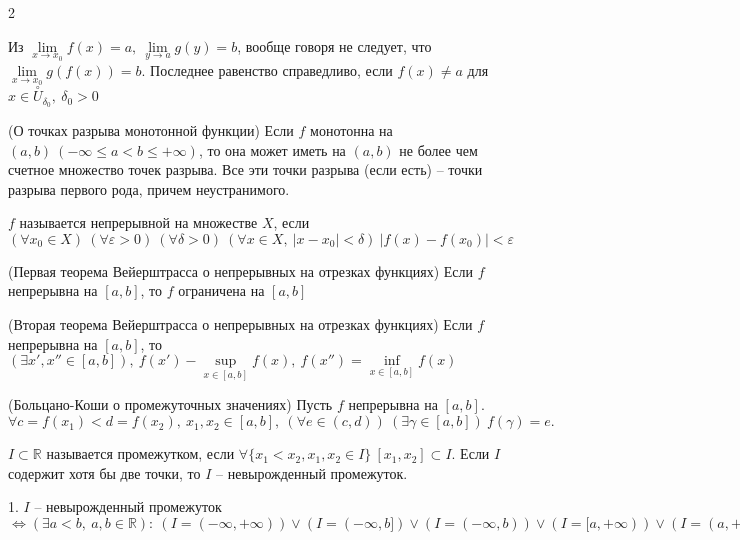 \begin{multicols}{2}
\begin{note}{}{} 
    Из $\lim\limits_{x\to x_0} f(x) = a,\ \lim\limits_{y\to a} g(y) = b$, вообще говоря не следует, что $\lim\limits_{x\to x_0} g(f(x)) = b$. Последнее равенство справедливо, если $f(x) \neq a$ для $x \in \overset{\circ}{U}_{\delta_0},\ \delta_0 > 0$
\end{note}
\begin{theorema}{(О точках разрыва монотонной функции)}{} 
    Если $f$ монотонна на $(a,b)\ (-\infty \leq a < b \leq +\infty)$, то она может иметь на $(a,b)$ не более чем счетное множество точек разрыва. Все эти точки разрыва (если есть) -- точки разрыва первого рода, причем неустранимого.
\end{theorema}
\begin{definition}{}{}$f$ называется непрерывной на множестве $X$, если $(\forall x_0\in X)\ (\forall \varepsilon > 0)\ (\forall \delta > 0)\ (\forall x \in X,\ |x - x_0| < \delta)\ |f(x) - f(x_0)| < \varepsilon$
\end{definition}
\begin{theorema}{(Первая теорема Вейерштрасса о непрерывных на отрезках функциях)}{}
     Если $f$ непрерывна на $[a,b]$, то $f$ ограничена на $[a,b]$
\end{theorema}
\begin{theorema}{(Вторая теорема Вейерштрасса о непрерывных на отрезках функциях)}{} 
    Если $f$ непрерывна на $[a,b]$, то $(\exists x', x''\in [a,b]), \ f(x') - \sup\limits_{x\in [a,b]}f(x),\ f(x'') = \inf\limits_{x\in[a,b]} f(x)$
\end{theorema}
\begin{theorema}{(Больцано-Коши о промежуточных значениях)}{}
 Пусть $f$ непрерывна на $[a,b]$. $\forall c = f(x_1) < d = f(x_2),\ x_1,x_2\in [a,b],\ (\forall e \in (c,d))\ (\exists \gamma \in [a,b])\ f(\gamma) = e.$
\end{theorema}
\begin{definition}{}{} $I \subset \mathbb R$ называется промежутком, если $\forall \{x_1 < x_2, x_1, x_2 \in I\}\ [x_1, x_2] \subset I.$ Если $I$ содержит хотя бы две точки, то $I$ -- невырожденный промежуток.
\end{definition}
\begin{lemma}{}{} 
    1. $I$ -- невырожденный промежуток $\Leftrightarrow (\exists a < b,\ a, b \in \mathbb R):\ (I = (-\infty, +\infty)) \vee (I = (-\infty, b]) \vee (I = (-\infty, b)) \vee (I = [a, +\infty))\vee (I = (a, + \infty)) \vee (I = (a,b)) \vee (I = [a,b)) \vee (I = (a,b]) \vee (I = [a,b])$
\end{lemma}

\end{multicols}
